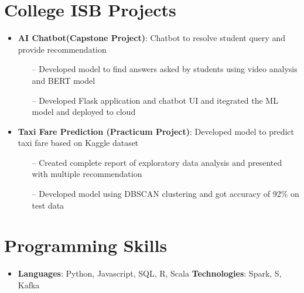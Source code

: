 \documentclass[letterpaper,11pt]{article}
\newcommand{\resumeItem}[2]{
  \item\small{
    \textbf{#1}{: #2 \vspace{-2pt}}
  }
}
\newcommand{\resumeSubItem}[2]{\resumeItem{#1}{#2}\vspace{-4pt}}
\newcommand{\resumeSubHeadingListStart}{\begin{itemize}[leftmargin=*]}
\newcommand{\resumeSubHeadingListEnd}{\end{itemize}}
\begin{document}
\section{College ISB Projects}
  \resumeSubHeadingListStart
    \resumeSubItem{AI Chatbot(Capstone Project)}
      {Chatbot to resolve student query and provide recommendation}
        \begin{itemize}
            \item[--] Developed model to find answers asked by students using video analysis and BERT model
            \item[--] Developed Flask application and chatbot UI and itegrated the ML model and deployed to cloud
        \end{itemize}
    \resumeSubItem{Taxi Fare Prediction (Practicum Project)}
      {Developed model to predict taxi fare based on Kaggle dataset}
        \begin{itemize}
            \item[--] Created complete report of exploratory data analysis and presented with multiple recommendation
            \item[--] Developed model using DBSCAN clustering and got accuracy of 92\% on test data
        \end{itemize}
  \resumeSubHeadingListEnd

\section{Programming Skills}
 \resumeSubHeadingListStart
   \item{
     \textbf{Languages}{: Python, Javascript, SQL, R, Scala}
     \hfill
     \textbf{Technologies}{: Spark, S, Kafka}
   }
 \resumeSubHeadingListEnd


\end{document}
